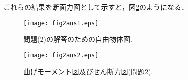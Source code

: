 \documentclass[10pt,a4j]{jarticle}
\begin{document}
これらの結果を断面力図として示すと，図\ref{fig:fig2_2}のようになる．
\begin{figure}[h]
	\begin{center}
	\texttt{[image: fig2ans1.eps]} 
	\end{center}
	\caption{問題(2)の解答のための自由物体図.} 
	\label{fig:fig2_1}
\end{figure}
\begin{figure}[h]
	\begin{center}
	\texttt{[image: fig2ans2.eps]} 
	\end{center}
	\caption{曲げモーメント図及びせん断力図(問題2).} 
	\label{fig:fig2_2}
\end{figure}
\end{document}

